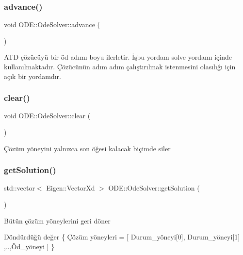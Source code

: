 \subsubsection{\texorpdfstring{advance()}{advance()}}
{\footnotesize\ttfamily void O\+D\+E\+::\+Ode\+Solver\+::advance (\begin{DoxyParamCaption}{ }\end{DoxyParamCaption})}

A\+TD çözücüyü bir öd adımı boyu ilerletir. İşbu yordam solve yordamı içinde kullanılmaktadır. Çözücünün adım adım çalıştırılmak istenmesini olasılığı için açık bir yordamdır. \mbox{\label{classODE_1_1OdeSolver_ac766ba00b92441cc7cfe8b37f0ec9ef0}} 
\subsubsection{\texorpdfstring{clear()}{clear()}}
{\footnotesize\ttfamily void O\+D\+E\+::\+Ode\+Solver\+::clear (\begin{DoxyParamCaption}{ }\end{DoxyParamCaption})}

Çözüm yöneyini yalnızca son öğesi kalacak biçimde siler \mbox{\label{classODE_1_1OdeSolver_a5916469dc1fa28d9ff57e59f6c603a58}} 
\subsubsection{\texorpdfstring{getSolution()}{getSolution()}}
{\footnotesize\ttfamily std\+::vector$<$ Eigen\+::\+Vector\+Xd $>$ O\+D\+E\+::\+Ode\+Solver\+::get\+Solution (\begin{DoxyParamCaption}{ }\end{DoxyParamCaption})}

Bütün çözüm yöneylerini geri döner \begin{DoxyReturn}{Döndürdüğü değer}
\{ Çözüm yöneyleri = \mbox{[} Durum\+\_\+yöneyi\mbox{[}0\mbox{]}, Durum\+\_\+yöneyi\mbox{[}1\mbox{]} ,..,Öd\+\_\+yöneyi \mbox{]} \} 
\end{DoxyReturn}
\mbox{\label{classODE_1_1OdeSolver_a53712a99a5282ac30c53c9016bc540ae}} 
